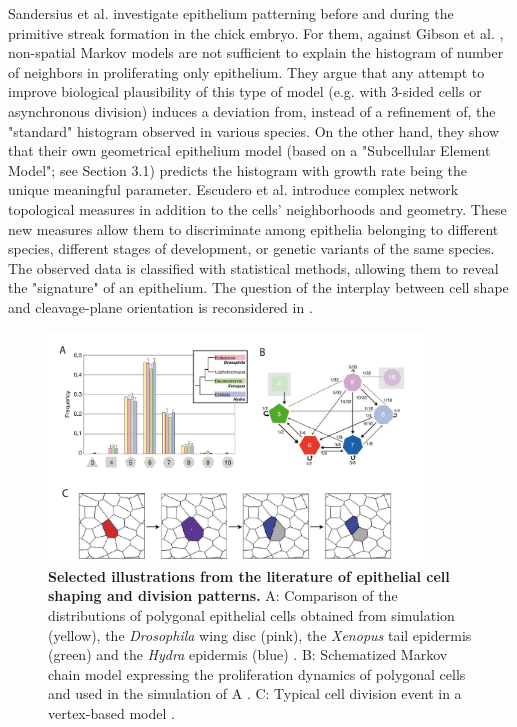   Sandersius et al. \cite{Sandersius:2011ug} investigate epithelium patterning before and during the primitive streak formation in the chick embryo. For them, against Gibson et al. \cite{Gibson:2006gia}, non-spatial Markov models are not sufficient to explain the histogram of number of neighbors in proliferating only epithelium. They argue that any attempt to improve biological plausibility of this type of model (e.g. with 3-sided cells or asynchronous division) induces a deviation from, instead of a refinement of, the "standard" histogram observed in various species. On the other hand, they show that their own geometrical epithelium model (based on a "Subcellular Element Model"; see Section 3.1) predicts the histogram with growth rate being the unique meaningful parameter. Escudero et al. \cite{Escudero:2011cv} introduce complex network topological measures in addition to the cells' neighborhoods and geometry. These new measures allow them to discriminate among epithelia belonging to different species, different stages of development, or genetic variants of the same species. The observed data is classified with statistical methods, allowing them to reveal the "signature" of an epithelium. The question of the interplay between cell shape and cleavage-plane orientation is reconsidered in \cite{Gibson:2011em}. 
\begin{figure}
\begin{center}
\includegraphics[width=0.9\textwidth]{../../images/biomechanics_sota/epithelium.png}
\end{center}
\caption{\textbf{Selected illustrations from the literature of epithelial cell shaping and division patterns.} A: Comparison of the distributions of polygonal epithelial cells obtained from simulation (yellow), the \textit{Drosophila} wing disc (pink), the \textit{Xenopus} tail epidermis (green) and the \textit{Hydra} epidermis (blue) \cite{Gibson:2006gia}. B: Schematized Markov chain model expressing the proliferation dynamics of polygonal cells and used in the simulation of A \cite{Gibson:2006gia}. C: Typical cell division event in a vertex-based model \cite{Farhadifar:2007vj}.}
\label{biomechanics_sota_epithelium}
\end{figure}


